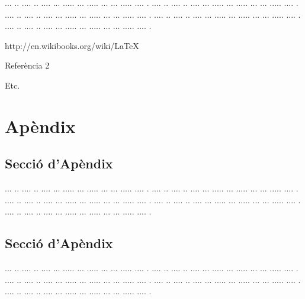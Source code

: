 \documentclass[10pt,a4paper,twocolumn,twoside]{article}
\begin{document}
... ..  .... .. .... ... ..... ... ..... ... ... ..... .... .
.... ..  .... .. .... ... ..... ... ..... ... ... ..... .... .
.... ..  .... .. .... ... ..... ... ..... ... ... ..... .... .
.... ..  .... .. .... ... ..... ... ..... ... ... ..... .... .
.... ..  .... .. .... ... ..... ... ..... ... ... ..... .... .

\begin{thebibliography}{11}
http://en.wikibooks.org/wiki/LaTeX

Referència 2

Etc.


\end{thebibliography}

\appendix

\section*{Apèndix}

\setcounter{section}{1}

\subsection{Secció d'Apèndix}


... ..  .... .. .... ... ..... ... ..... ... ... ..... .... .
.... ..  .... .. .... ... ..... ... ..... ... ... ..... .... .
.... ..  .... .. .... ... ..... ... ..... ... ... ..... .... .
.... ..  .... .. .... ... ..... ... ..... ... ... ..... .... .
.... ..  .... .. .... ... ..... ... ..... ... ... ..... .... .

\subsection{Secció d'Apèndix}


... ..  .... .. .... ... ..... ... ..... ... ... ..... .... .
.... ..  .... .. .... ... ..... ... ..... ... ... ..... .... .
.... ..  .... .. .... ... ..... ... ..... ... ... ..... .... .
.... ..  .... .. .... ... ..... ... ..... ... ... ..... .... .
.... ..  .... .. .... ... ..... ... ..... ... ... ..... .... .
\end{document}

